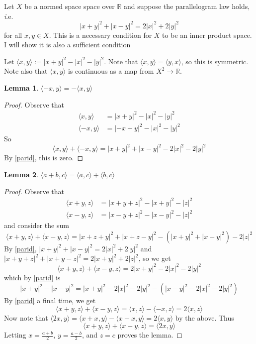 \documentclass{article}
\newcommand{\R}{\mathbb{R}}
\newcommand{\ie}{\emph i.e.}
\newcommand{\norm}[1]{|#1|}
\newcommand{\normsq}[1]{\norm{#1}^2}
\newcommand{\inner}[1]{\langle #1\rangle}
\newtheorem{lemma}{Lemma}
\begin{document}
Let $X$ be a normed space space over $\R$ and suppose the parallelogram law holds, \ie 
\begin{equation}
  \tag{*}
  \normsq{x+y}+\normsq{x-y}=2\normsq{x}+2\normsq{y}
  \label{parid}
\end{equation}
for all $x,y\in X$. This is a necessary condition for $X$ to be an inner product space. I will show it is also a sufficient condition

Let $\inner{x,y}:=\normsq{x+y}-\normsq x - \normsq y$.
Note that $\inner{x,y}=\inner{y,x}$, so this is symmetric.
Note also that $\inner{x,y}$ is continuous as a map from $X^2\to \R$.
\begin{lemma}
$\inner{-x,y}=-\inner{x,y}$
\end{lemma}
\begin{proof}
  Observe that 
  \begin{align*}
    \inner{x,y}&=\normsq{x+y}-\normsq x - \normsq y\\
    \inner{-x,y}&=\normsq{-x+y}-\normsq x - \normsq y
  \end{align*}
  So 
  \[
  \inner{x,y}+\inner{-x,y}=\normsq{x+y}+\normsq{x-y}-2\normsq x - 2\normsq y
  \]
  By \eqref{parid}, this is zero.
\end{proof}

\begin{lemma}
  $\inner{a+b,c}=\inner{a,c}+\inner{b,c}$
  \label{lem:adding}
\end{lemma}
\begin{proof}
  Observe that
  \begin{align*}
    \inner{x+y,z}&=\normsq{x+y+z}-\normsq {x+y}-\normsq z\\
    \inner{x-y,z}&=\normsq{x-y+z}-\normsq {x-y}-\normsq z
  \end{align*}
  and consider the sum
  \[
  \inner{x+y,z}+\inner{x-y,z}=\normsq{x+z+y}+\normsq{x+z-y}-(\normsq{x+y}+\normsq{x-y})-2\normsq z
  \]
  By \eqref{parid}, $\normsq{x+y}+\normsq{x-y}=2\normsq{x}+2\normsq{y}$ and $\normsq{x+y+z}+\normsq{x+y-z}=2\normsq{x+y}+2\normsq z$, so we get
  \[
  \inner{x+y,z}+\inner{x-y,z}=2\normsq{x+y}-2\normsq x - 2\normsq y
  \]
  which by \eqref{parid} is
  \[
  \normsq{x+y}-\normsq{x-y}= \normsq{x+y}-2\normsq x-2\normsq y -(\normsq{x-y}-2\normsq{x}-2\normsq{y})
  \]
  By \eqref{parid} a final time, we get
  \[
  \inner{x+y,z}+\inner{x-y,z}=\inner{x,z}-\inner{-x,z}=2\inner{x,z}
  \]
  Now note that $\inner{2x,y}=\inner{x+x,y}-\inner{x-x,y}=2\inner{x,y}$ by the above. Thus 
  \[
  \inner{x+y,z}+\inner{x-y,z}=\inner{2x,y}
  \]
  Letting $x=\frac{a+b}{2}$, $y=\frac{a-b}2$, and $z=c$ proves the lemma.
\end{proof}
\end{document}
